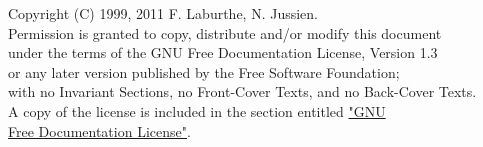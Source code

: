 \begin{myquote}
Copyright (C)  1999, 2011  F. Laburthe, N. Jussien.\\
Permission is granted to copy, distribute and/or modify this document\\
under the terms of the GNU Free Documentation License, Version 1.3\\
or any later version published by the Free Software Foundation;\\
with no Invariant Sections, no Front-Cover Texts, and no Back-Cover Texts.\\
A copy of the license is included in the section entitled \hyperlink{licence}{"GNU \\Free Documentation License"}.
\end{myquote}
